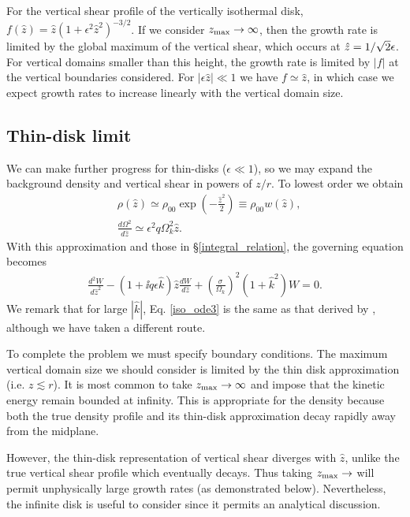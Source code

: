 For the vertical shear profile of the vertically isothermal
disk, $f(\hat{z}) =
\hat{z}\left(1+\epsilon^2\hat{z}^2\right)^{-3/2}$. If we consider
$z_\mathrm{max}\to\infty$,  then the growth rate is limited by the global
maximum of the vertical shear, which occurs at $\hat{z}
=1/\sqrt{2}\epsilon$.  
For vertical domains smaller than this height, the growth rate is
limited by $|f|$ at the vertical boundaries considered. For 
$|\epsilon\hat{z}|\ll1$ we have $f\simeq \hat{z}$, in which case we
expect growth rates to increase linearly with the vertical domain
size.  

\subsection{Thin-disk limit}
We can make further progress for thin-disks ($\epsilon\ll1$), 
so we may expand the background density and vertical shear in powers
of $z/r$. To lowest order we obtain 
\begin{align}
  &\rho(\hat{z}) \simeq \rho_{00}
  \exp{\left(-\frac{\hat{z}^2}{2}\right)} \equiv \rho_{00}w(\hat{z}),\label{thin_dens}\\
  &\frac{d\Omega^2}{d\hat{z}} \simeq \epsilon^2q\Omega_k^2\hat{z}. \label{thin_vshear}
\end{align}
With this approximation and those in \S\ref{integral_relation}, the
governing equation becomes 
\begin{align}\label{iso_ode3}
  \frac{d^2W}{d\hat{z}^2} - \left(1 + \ii q\epsilon
    \hat{k}\right)\hat{z}\frac{dW}{d\hat{z}} +
  \left(\frac{\sigma}{\Omega_k}\right)^2\left(1+\hat{k}^2\right)W = 
  0.
\end{align}
We remark that for large $|\hat{k}|$, Eq. \ref{iso_ode3} is the same as
that derived by \cite{nelson13}, although we have taken a different
route.  

To complete the problem we must specify boundary conditions. The
maximum vertical domain size we should consider is limited by the thin disk
approximation (i.e. $z\lesssim r$). It is most common to take $z_\mathrm{max}\to\infty$
and impose that the kinetic  energy remain bounded at infinity.  This
is appropriate for the density because both the true density profile
and its thin-disk approximation decay rapidly away from the midplane.   

However, the thin-disk representation of vertical shear diverges with 
$\hat{z}$, unlike the true vertical shear profile which eventually
decays.  Thus taking $z_\mathrm{max}\to$ will permit unphysically large growth
rates (as demonstrated below). Nevertheless, the infinite disk is
useful to consider since it permits an analytical discussion. 

